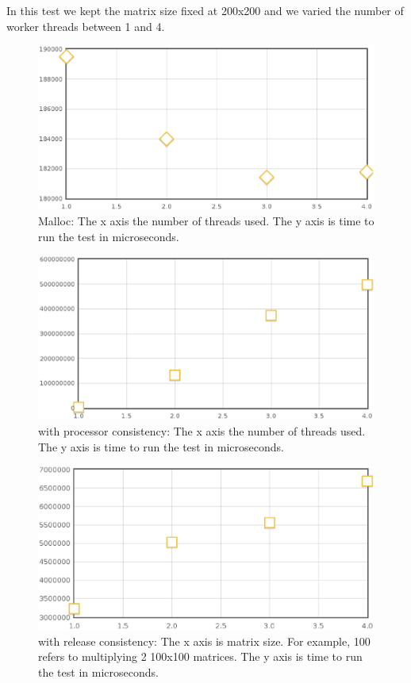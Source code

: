 In this test we kept the matrix size fixed at 200x200 and we varied the number of worker threads between 1 and 4.

\begin{figure}[!h]
\centering
\includegraphics[scale=0.40]{images/malloc-fixed-matrix.eps}
\caption{Malloc: The x axis the number of threads used. The y axis is time to run the test in microseconds.}
\end{figure}

\begin{figure}[!h]
\centering
\includegraphics[scale=0.40]{images/mmult-lh-fixed-size.eps}
\caption{\projname{} with processor consistency: The x axis the number of threads used. The y axis is time to run the test in microseconds.}
\end{figure}

\begin{figure}[!h]
\centering
\includegraphics[scale=0.40]{images/mmlh-fixed-size.eps}
\caption{\projname{} with release consistency: The x axis is matrix size. For example, 100 refers to multiplying 2 100x100 matrices. The y axis is time to run the test in microseconds.}
\end{figure}

